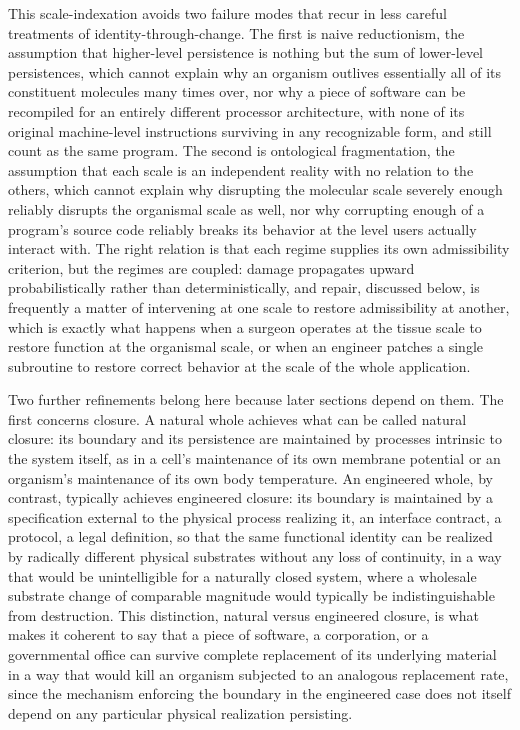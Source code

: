 \documentclass[11pt]{article}
\begin{document}
This scale-indexation avoids two failure modes that recur in less careful treatments of identity-through-change. The first is naive reductionism, the assumption that higher-level persistence is nothing but the sum of lower-level persistences, which cannot explain why an organism outlives essentially all of its constituent molecules many times over, nor why a piece of software can be recompiled for an entirely different processor architecture, with none of its original machine-level instructions surviving in any recognizable form, and still count as the same program. The second is ontological fragmentation, the assumption that each scale is an independent reality with no relation to the others, which cannot explain why disrupting the molecular scale severely enough reliably disrupts the organismal scale as well, nor why corrupting enough of a program's source code reliably breaks its behavior at the level users actually interact with. The right relation is that each regime supplies its own admissibility criterion, but the regimes are coupled: damage propagates upward probabilistically rather than deterministically, and repair, discussed below, is frequently a matter of intervening at one scale to restore admissibility at another, which is exactly what happens when a surgeon operates at the tissue scale to restore function at the organismal scale, or when an engineer patches a single subroutine to restore correct behavior at the scale of the whole application.

Two further refinements belong here because later sections depend on them. The first concerns closure. A natural whole achieves what can be called natural closure: its boundary and its persistence are maintained by processes intrinsic to the system itself, as in a cell's maintenance of its own membrane potential or an organism's maintenance of its own body temperature. An engineered whole, by contrast, typically achieves engineered closure: its boundary is maintained by a specification external to the physical process realizing it, an interface contract, a protocol, a legal definition, so that the same functional identity can be realized by radically different physical substrates without any loss of continuity, in a way that would be unintelligible for a naturally closed system, where a wholesale substrate change of comparable magnitude would typically be indistinguishable from destruction. This distinction, natural versus engineered closure, is what makes it coherent to say that a piece of software, a corporation, or a governmental office can survive complete replacement of its underlying material in a way that would kill an organism subjected to an analogous replacement rate, since the mechanism enforcing the boundary in the engineered case does not itself depend on any particular physical realization persisting.
\end{document}
